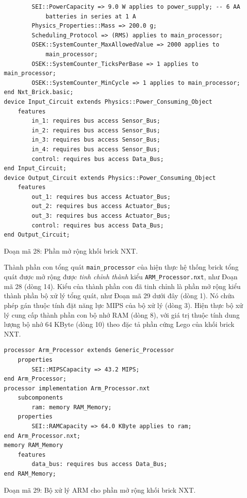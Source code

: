 \begin{verbatim}
        SEI::PowerCapacity => 9.0 W applies to power_supply; -- 6 AA
            batteries in series at 1 A
        Physics_Properties::Mass => 200.0 g;
        Scheduling_Protocol => (RMS) applies to main_processor;
        OSEK::SystemCounter_MaxAllowedValue => 2000 applies to
            main_processor;
        OSEK::SystemCounter_TicksPerBase => 1 applies to main_processor;
        OSEK::SystemCounter_MinCycle => 1 applies to main_processor;
end Nxt_Brick.basic;
device Input_Circuit extends Physics::Power_Consuming_Object
    features
        in_1: requires bus access Sensor_Bus;
        in_2: requires bus access Sensor_Bus;
        in_3: requires bus access Sensor_Bus;
        in_4: requires bus access Sensor_Bus;
        control: requires bus access Data_Bus;
end Input_Circuit;
device Output_Circuit extends Physics::Power_Consuming_Object
    features
        out_1: requires bus access Actuator_Bus;
        out_2: requires bus access Actuator_Bus;
        out_3: requires bus access Actuator_Bus;
        control: requires bus access Data_Bus;
end Output_Circuit;
\end{verbatim}
\begin{center}\small Đoạn mã 28: Phần mở rộng khối brick NXT.\end{center}

Thành phần con tổng quát \texttt{main\_processor} của hiện thực hệ thống brick tổng quát được mở rộng được \emph{tinh chỉnh thành} kiểu \texttt{ARM\_Processor.nxt}, như Đoạn mã 28 (dòng 14). Kiểu của thành phần con đã tinh chỉnh là phần mở rộng kiểu thành phần bộ xử lý tổng quát, như Đoạn mã 29 dưới đây (dòng 1). Nó chứa phép gán thuộc tính đặt năng lực MIPS của bộ xử lý (dòng 3). Hiện thực bộ xử lý cung cấp thành phần con bộ nhớ RAM (dòng 8), với giá trị thuộc tính dung lượng bộ nhớ 64 KByte (dòng 10) theo đặc tả phần cứng Lego của khối brick NXT.
\begin{verbatim}
processor Arm_Processor extends Generic_Processor
    properties
        SEI::MIPSCapacity => 43.2 MIPS;
end Arm_Processor;
processor implementation Arm_Processor.nxt
    subcomponents
        ram: memory RAM_Memory;
    properties
        SEI::RAMCapacity => 64.0 KByte applies to ram;
end Arm_Processor.nxt;
memory RAM_Memory
    features
        data_bus: requires bus access Data_Bus;
end RAM_Memory;
\end{verbatim}
\begin{center}\small Đoạn mã 29: Bộ xử lý ARM cho phần mở rộng khối brick NXT.\end{center}

